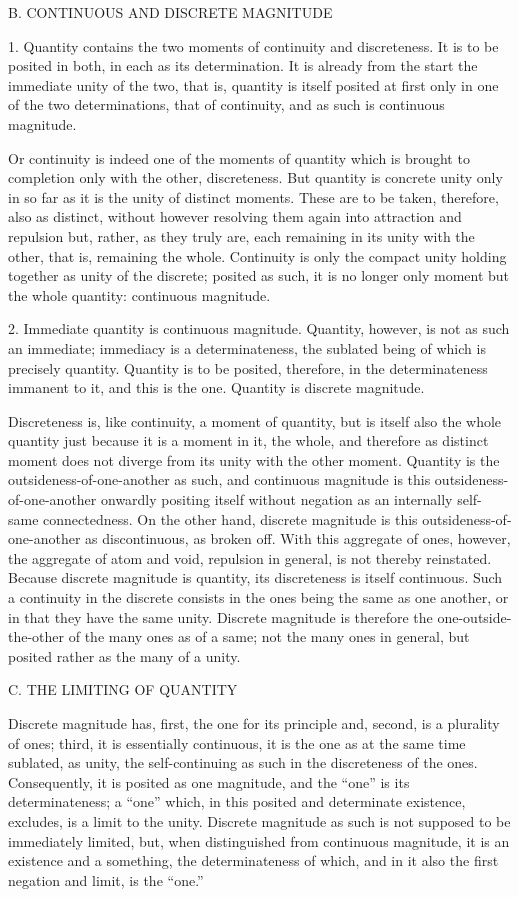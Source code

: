 B. CONTINUOUS AND DISCRETE MAGNITUDE

1. Quantity contains the two moments of continuity and discreteness.
It is to be posited in both, in each as its determination.
It is already from the start the immediate unity of the two,
that is, quantity is itself posited at first
only in one of the two determinations, that of continuity,
and as such is continuous magnitude.

Or continuity is indeed one of the moments of quantity
which is brought to completion only with the other, discreteness.
But quantity is concrete unity only in so far as
it is the unity of distinct moments.
These are to be taken, therefore, also as distinct,
without however resolving them again
into attraction and repulsion
but, rather, as they truly are,
each remaining in its unity with the other,
that is, remaining the whole.
Continuity is only the compact unity
holding together as unity of the discrete;
posited as such, it is no longer only moment
but the whole quantity: continuous magnitude.

2. Immediate quantity is continuous magnitude.
Quantity, however, is not as such an immediate;
immediacy is a determinateness,
the sublated being of which is precisely quantity.
Quantity is to be posited, therefore,
in the determinateness immanent to it,
and this is the one.
Quantity is discrete magnitude.

Discreteness is, like continuity, a moment of quantity,
but is itself also the whole quantity
just because it is a moment in it, the whole,
and therefore as distinct moment does not
diverge from its unity with the other moment.
Quantity is the outsideness-of-one-another as such,
and continuous magnitude is this outsideness-of-one-another
onwardly positing itself without negation
as an internally self-same connectedness.
On the other hand, discrete magnitude is this
outsideness-of-one-another as discontinuous, as broken off.
With this aggregate of ones, however,
the aggregate of atom and void,
repulsion in general, is not thereby reinstated.
Because discrete magnitude is quantity,
its discreteness is itself continuous.
Such a continuity in the discrete consists
in the ones being the same as one another,
or in that they have the same unity.
Discrete magnitude is therefore
the one-outside-the-other of
the many ones as of a same;
not the many ones in general,
but posited rather as the many of a unity.

C. THE LIMITING OF QUANTITY

Discrete magnitude has,
first, the one for its principle
and, second, is a plurality of ones;
third, it is essentially continuous,
it is the one as at the same time
sublated, as unity,
the self-continuing as such in
the discreteness of the ones.
Consequently, it is posited as one magnitude,
and the “one” is its determinateness;
a “one” which, in this posited and determinate existence,
excludes, is a limit to the unity.
Discrete magnitude as such is not supposed
to be immediately limited,
but, when distinguished from continuous magnitude,
it is an existence and a something,
the determinateness of which,
and in it also the first negation and limit,
is the “one.”

